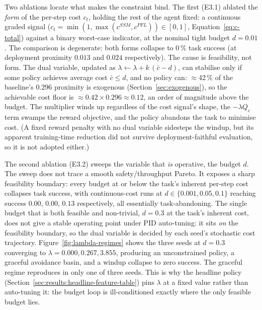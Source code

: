 \documentclass[11pt,a4paper]{report}
\newcommand{\ssm}{SSM}
\newcommand{\pfl}{PFL}
\begin{document}
Two ablations locate what makes the constraint bind. The first
(E3.1) ablated the \emph{form} of the per-step cost $c_t$, holding
the rest of the agent fixed: a continuous graded signal
($c_t = \min(1,\max(c^{\ssm},c^{\pfl})) \in [0,1]$,
Equation~\ref{eq:c-total}) against a binary worst-case indicator, at
the nominal tight budget $d = 0.01$. The comparison is degenerate:
both forms collapse to $0\,\%$ task success (at deployment proximity
$0.013$ and $0.024$ respectively). The cause is feasibility, not
form. The dual variable, updated as
$\lambda \leftarrow \lambda + k\,(\bar c - d)$, can stabilise only
if some policy achieves average cost $\bar c \le d$, and no policy
can: $\approx$42\,\% of the baseline's $0.296$ proximity is
exogenous (Section~\ref{sec:exogenous}), so the achievable cost
floor is $\approx 0.42 \times 0.296 \approx 0.12$, an order of
magnitude above the budget. The multiplier winds up regardless of
the cost signal's shape, the $-\lambda Q_c$ term swamps the reward
objective, and the policy abandons the task to minimise cost. (A
fixed reward penalty with no dual variable sidesteps the windup, but
its apparent training-time reduction did not survive
deployment-faithful evaluation, so it is not adopted either.)

The second ablation (E3.2) sweeps the variable that \emph{is}
operative, the budget $d$. The sweep does not trace a smooth
safety/throughput Pareto. It exposes a sharp feasibility boundary:
every budget at or below the task's inherent per-step cost collapses
task success, with continuous-cost runs at
$d \in \{0.001, 0.05, 0.1\}$ reaching success $0.00$, $0.00$, $0.13$
respectively, all essentially task-abandoning. The single budget
that is both feasible and non-trivial, $d = 0.3$ at the task's
inherent cost, does not give a stable operating point under PID
auto-tuning: it sits \emph{on} the feasibility boundary, so the dual
variable is decided by each seed's stochastic cost trajectory.
Figure~\ref{fig:lambda-regimes} shows the three seeds at $d = 0.3$
converging to $\lambda = 0.000, 0.267, 3.855$, producing an
unconstrained policy, a graceful avoidance basin, and a windup
collapse to zero success. The graceful regime reproduces in only one
of three seeds. This is why the headline policy
(Section~\ref{sec:results:headline-feature-table}) pins $\lambda$ at
a fixed value rather than auto-tuning it: the budget loop is
ill-conditioned exactly where the only feasible budget lies.
\end{document}

